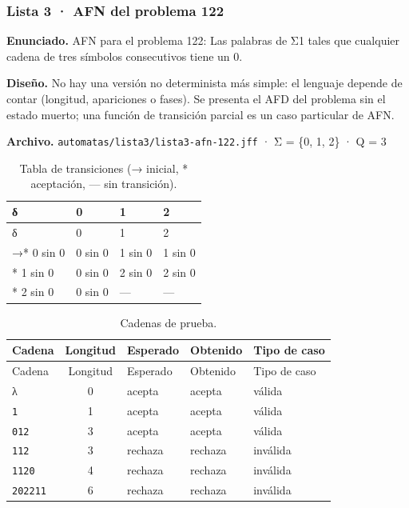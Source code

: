 
\hypertarget{lista-3-afn-del-problema-122}{%
\subsubsection{Lista 3 · AFN del problema 122}\label{lista-3-afn-del-problema-122}}

\textbf{Enunciado.} AFN para el problema 122: Las palabras de Σ1 tales que cualquier cadena de tres símbolos consecutivos tiene un 0.

\textbf{Diseño.} No hay una versión no determinista más simple: el lenguaje depende de contar (longitud, apariciones o fases). Se presenta el AFD del problema sin el estado muerto; una función de transición parcial es un caso particular de AFN.

\textbf{Archivo.} \texttt{automatas/lista3/lista3-afn-122.jff} · Σ = \{0, 1, 2\} · \textbar Q\textbar{} = 3

\begin{longtable}[]{@{}llll@{}}
\caption{Tabla de transiciones (→ inicial, * aceptación, --- sin transición).}\tabularnewline
\toprule\noalign{}
δ & 0 & 1 & 2 \\
\midrule\noalign{}
\endfirsthead
\toprule\noalign{}
δ & 0 & 1 & 2 \\
\midrule\noalign{}
\endhead
\bottomrule\noalign{}
\endlastfoot
→* 0 sin 0 & 0 sin 0 & 1 sin 0 & 1 sin 0 \\
* 1 sin 0 & 0 sin 0 & 2 sin 0 & 2 sin 0 \\
* 2 sin 0 & 0 sin 0 & --- & --- \\
\end{longtable}

\begin{longtable}[]{@{}lclll@{}}
\caption{Cadenas de prueba.}\tabularnewline
\toprule\noalign{}
Cadena & Longitud & Esperado & Obtenido & Tipo de caso \\
\midrule\noalign{}
\endfirsthead
\toprule\noalign{}
Cadena & Longitud & Esperado & Obtenido & Tipo de caso \\
\midrule\noalign{}
\endhead
\bottomrule\noalign{}
\endlastfoot
λ & 0 & acepta & acepta & válida \\
\texttt{1} & 1 & acepta & acepta & válida \\
\texttt{012} & 3 & acepta & acepta & válida \\
\texttt{112} & 3 & rechaza & rechaza & inválida \\
\texttt{1120} & 4 & rechaza & rechaza & inválida \\
\texttt{202211} & 6 & rechaza & rechaza & inválida \\
\end{longtable}

